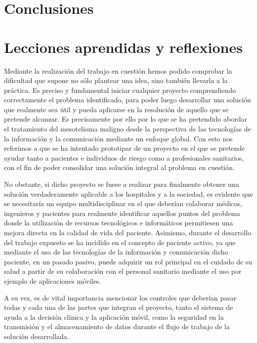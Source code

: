 \documentclass{article}
\begin{document}
\section{Conclusiones}

\section{Lecciones aprendidas y reflexiones}

Mediante la realización del trabajo en cuestión hemos podido comprobar
la dificultad que supone no  sólo  plantear  una  idea,  sino  también
llevarla a la práctica.  Es preciso y  fundamental  iniciar  cualquier
proyecto comprendiendo correctamente el  problema  identificado,  para
poder luego desarrollar una solución que realmente sea	útil  y  pueda
aplicarse en la resolución de aquello que se  pretende	alcanzar.   Es
precisamente  por  ello  por  lo  que  se  ha  pretendido  abordar  el
tratamiento del  mesotelioma  maligno  desde  la  perspectiva  de  las
tecnologías de la información y la comunicación  mediante  un  enfoque
global.  Con esto nos referimos a que se ha intentado prototipar de un
proyecto en el que se pretende ayudar tanto a pacientes  e  individuos
de riesgo como	a  profesionales  sanitarios,  con  el	fin  de  poder
consolidar  una   solución   integral	al   problema	en   cuestión.

No obstante, si dicho proyecto se fuese  a  realizar  para  finalmente
obtener una solución verdaderamente aplicable a los hospitales y a  la
sociedad, es evidente que se necesitaría un equipo multidisciplinar en
el  que  deberían  colaborar  médicos,	ingenieros  y  pacientes  para
realmente  identificar	aquellos  puntos   del	 problema   donde   la
utilización de recursos tecnológicos e	informáticos  permitiesen  una
mejora directa en la calidad de vida del paciente.  Asimismo,  durante
el desarrollo del trabajo expuesto se ha incidido en  el  concepto  de
paciente activo, ya que mediante el  uso  de  las  tecnologías	de  la
información y comunicación dicho paciente, en un pasado pasivo,  puede
adquirir un rol principal en el cuidado de su salud  a	partir	de  su
colaboración con el personal sanitario mediante el uso por ejemplo  de
aplicaciones móviles.

A su vez, es de vital importancia mencionar los controles que deberían
pasar todas y cada una de las partes que integran el  proyecto,  tanto
el sistema de ayuda a la decisión clínica y la aplicación móvil,  como
la seguridad en la transmisión y el almacenamiento de datos durante el
flujo de trabajo de la solución desarrollada.
\end{document}
